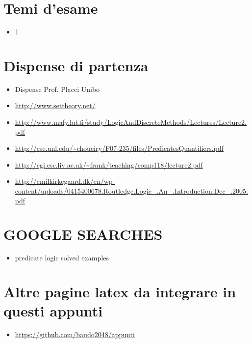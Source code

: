 \section{Temi d'esame}
  \begin{itemize}
   \item 1
  \end{itemize}

\section{Dispense di partenza}
\begin{itemize}
  \item Dispense Prof. Placci Unibo
  \item \url{http://www.settheory.net/}
  \item \url{http://www.mafy.lut.fi/study/LogicAndDiscreteMethods/Lectures/Lecture2.pdf}
  \item \url{http://cse.unl.edu/~choueiry/F07-235/files/PredicatesQuantifiers.pdf}
  \item \url{http://cgi.csc.liv.ac.uk/~frank/teaching/comp118/lecture2.pdf}
  \item \url{http://emilkirkegaard.dk/en/wp-content/uploads/0415400678.Routledge.Logic_.An_.Introduction.Dec_.2005.pdf}
\end{itemize}

\section{GOOGLE SEARCHES}
\begin{itemize}
 \item predicate logic solved examples
\end{itemize}

\section{Altre pagine latex da integrare in questi appunti}
\begin{itemize}
 \item \url{https://github.com/baudo2048/appunti}
\end{itemize}




